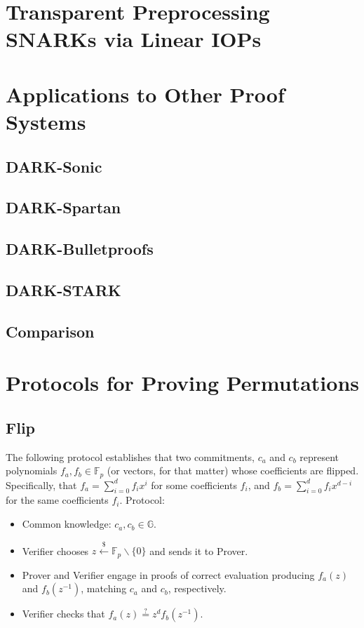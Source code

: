 \documentclass{article}
\theoremstyle{definition}
\begin{document}
\section{Transparent Preprocessing SNARKs via Linear IOPs} 


\section{Applications to Other Proof Systems}

\subsection{DARK-Sonic}

\subsection{DARK-Spartan}

\subsection{DARK-Bulletproofs}

\subsection{DARK-STARK}

\subsection{Comparison}

%

  

\appendix


\section{Protocols for Proving Permutations}


\subsection{Flip}

The following protocol establishes that two commitments, $c_a$ and $c_b$ represent polynomials $f_a, f_b \in \mathbb{F}_p$ (or vectors, for that matter) whose coefficients are flipped. Specifically, that $f_a = \sum_{i=0}^{d}f_i x^i$ for some coefficients $f_i$, and $f_b = \sum_{i=0}^df_ix^{d-i}$ for the same coefficients $f_i$.
Protocol:
\begin{itemize}
    \item Common knowledge: $c_a, c_b \in \mathbb{G}$.
    \item Verifier chooses $z \xleftarrow{\$} \mathbb{F}_p \backslash \{0\}$ and sends it to Prover.
    \item Prover and Verifier engage in proofs of correct evaluation producing $f_a(z)$ and $f_b(z^{-1})$, matching $c_a$ and $c_b$, respectively.
    \item Verifier checks that $f_a(z) \stackrel{?}{=} z^d f_b(z^{-1})$.
\end{itemize}
\end{document}
